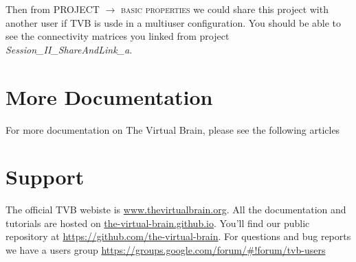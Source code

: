 \documentclass{tufte-handout}
\begin{document}
Then from \textsc{PROJECT} $\rightarrow$ \textsc{basic properties} we could
share this project with another user if TVB is usde in a multiuser
configuration.  You should be able to see the connectivity matrices you linked
from project \textit{Session\_II\_ShareAndLink\_a}.


\section{More Documentation}\label{sec:more-doc}

For more documentation on The Virtual Brain, please see the following articles
\cite{Sanz-Leon_2013, Spiegler_2013, Woodman_2014, Jirsa_2010b}

\section{Support}\label{sec:support}

The official TVB webiste is \url{www.thevirtualbrain.org}.  
All the documentation and tutorials are hosted on \url{the-virtual-brain.github.io}.
You'll find our public  repository at \url{https://github.com/the-virtual-brain}. 
For questions and bug reports we have a users group \url{https://groups.google.com/forum/#!forum/tvb-users}



\end{document}
